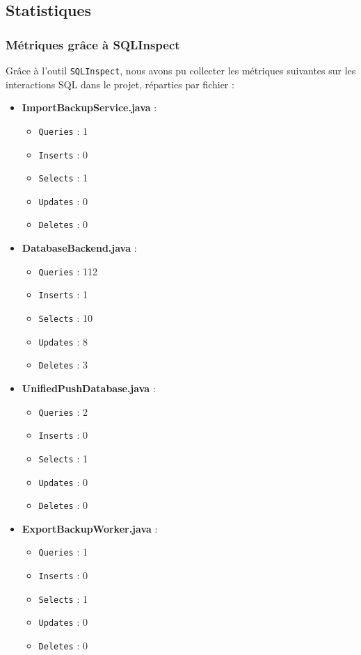 \documentclass[a4paper,11pt]{article}
\begin{document}
\subsection*{Statistiques}

\subsubsection*{Métriques grâce à SQLInspect}

Grâce à l'outil \texttt{SQLInspect}, nous avons pu collecter les métriques suivantes sur les interactions SQL dans le projet, réparties par fichier :

\begin{itemize}
    \item \textbf{ImportBackupService.java} :
    \begin{itemize}
        \item \texttt{Queries} : 1
        \item \texttt{Inserts} : 0
        \item \texttt{Selects} : 1
        \item \texttt{Updates} : 0
        \item \texttt{Deletes} : 0
    \end{itemize}
    \item \textbf{DatabaseBackend.java} :
    \begin{itemize}
        \item \texttt{Queries} : 112
        \item \texttt{Inserts} : 1
        \item \texttt{Selects} : 10
        \item \texttt{Updates} : 8
        \item \texttt{Deletes} : 3
    \end{itemize}
    \item \textbf{UnifiedPushDatabase.java} :
    \begin{itemize}
        \item \texttt{Queries} : 2
        \item \texttt{Inserts} : 0
        \item \texttt{Selects} : 1
        \item \texttt{Updates} : 0
        \item \texttt{Deletes} : 0
    \end{itemize}
    \item \textbf{ExportBackupWorker.java} :
    \begin{itemize}
        \item \texttt{Queries} : 1
        \item \texttt{Inserts} : 0
        \item \texttt{Selects} : 1
        \item \texttt{Updates} : 0
        \item \texttt{Deletes} : 0
    \end{itemize}
\end{itemize}
\end{document}
